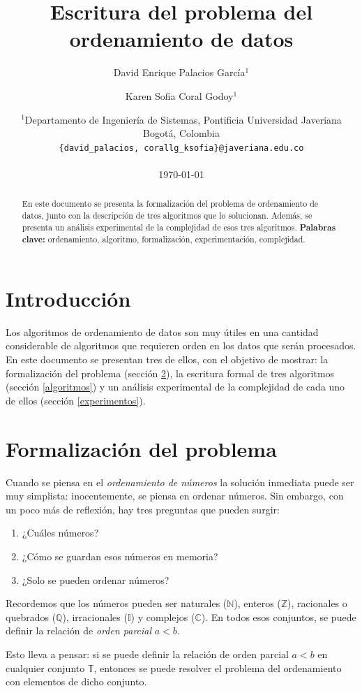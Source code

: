 \documentclass[letter]{article}
\title{Escritura del problema del ordenamiento de datos}
\author{David Enrique Palacios García$^1$ \and Karen Sofia Coral Godoy$^1$}
\date{
	$^1$Departamento de Ingeniería de Sistemas, Pontificia Universidad Javeriana\\Bogotá,  Colombia \\
	\texttt{\{david\_palacios, corallg\_ksofia\}@javeriana.edu.co}\\~\\
	\today
}
\begin{document}
\maketitle
	
\begin{abstract}
En este documento se presenta la formalización del problema de ordenamiento de datos, junto con la descripción de tres algoritmos que lo solucionan. Además, se presenta un análisis experimental de la complejidad de esos tres algoritmos.
\textbf{Palabras clave:} ordenamiento, algoritmo, formalización, experimentación, complejidad.
\end{abstract}

\tableofcontents
	
\section{Introducción} \label{intro}
Los algoritmos de ordenamiento de datos son muy útiles en una cantidad considerable de algoritmos que requieren orden en los datos que serán procesados. En este documento se presentan tres de ellos, con el objetivo de mostrar: la formalización del problema (sección \ref{formalizacion}), la escritura formal de tres algoritmos (sección \ref{algoritmos}) y un análisis experimental de la complejidad de cada uno de ellos (sección \ref{experimentos}).

\section{Formalización del problema} \label{formalizacion}
Cuando se piensa en el {\it ordenamiento de números} la solución inmediata puede ser muy simplista: inocentemente, se piensa en ordenar números. Sin embargo, con un poco más de reflexión, hay tres preguntas que pueden surgir:
\begin{enumerate}
  \item ¿Cuáles números?
  \item ¿Cómo se guardan esos números en memoria?
  \item ¿Solo se pueden ordenar números?
\end{enumerate}

Recordemos que los números pueden ser naturales ($\mathbb{N}$), enteros ($\mathbb{Z}$), racionales o quebrados ($\mathbb{Q}$), irracionales ($\mathbb{I}$) y complejos ($\mathbb{C}$). En todos esos conjuntos, se puede definir la relación de {\it orden parcial} $a<b$.

Esto lleva a pensar: si se puede definir la relación de orden parcial $a<b$ en cualquier conjunto $\mathbb{T}$, entonces se puede resolver el problema del ordenamiento con elementos de dicho conjunto.
\end{document}
